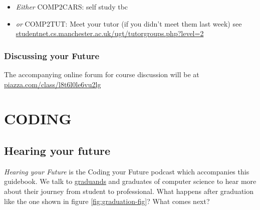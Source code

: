 \documentclass[
]{book}
\providecommand{\tightlist}{%
  \setlength{\itemsep}{0pt}\setlength{\parskip}{0pt}}
\begin{document}
\begin{itemize}
\tightlist
\item
  \emph{Either} COMP2CARS: self study tbc
\item
  \emph{or} COMP2TUT: Meet your tutor (if you didn't meet them last week) see \href{http://studentnet.cs.manchester.ac.uk/ugt/tutorgroups.php?level=2}{studentnet.cs.manchester.ac.uk/ugt/tutorgroups.php?level=2}
\end{itemize}

\hypertarget{discussing-your-future}{%
\section{Discussing your Future}\label{discussing-your-future}}

The accompanying online forum for course discussion will be at \href{https://piazza.com/class/l8t6l0le6vu2lg}{piazza.com/class/l8t6l0le6vu2lg}

\hypertarget{part-coding}{%
\part{CODING}\label{part-coding}}

\hypertarget{hearing}{%
\chapter{Hearing your future}\label{hearing}}

\emph{Hearing your Future} is the Coding your Future podcast which accompanies this guidebook. We talk to \href{https://en.wiktionary.org/wiki/graduand}{graduands} and graduates of computer science to hear more about their journey from student to professional. What happens after graduation like the one shown in figure \ref{fig:graduation-fig}? What comes next?
\end{document}
